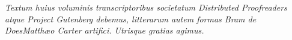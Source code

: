\thispagestyle{empty}
\vspace*{\fill}
\begin{center}
    \begin{minipage}{0.8\linewidth}
        \centering
        \itshape
        Textum huius voluminis transcriptoribus societatum
        \textup{Distributed Proofreaders} atque \textup{Project
        Gutenberg} debemus, litterarum autem formas
        \ifnum{} Bram de Does\else Matthæo Carter\fi{}
        artifici. Utrisque gratias agimus.
    \end{minipage}
\end{center}
\vspace*{\fill}
